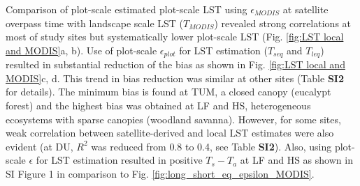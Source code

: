 \documentclass[fleqn,10pt]{wlscirep}
\begin{document}
Comparison of plot-scale estimated plot-scale LST using $\epsilon_{MODIS}$ at satellite overpass time with landscape scale LST ($T_{MODIS}$) revealed strong correlations at most of study sites but systematically lower plot-scale LST (Fig. \ref{fig:LST local and MODIS}a, b). Use  of plot-scale $\epsilon_{plot}$ for LST estimation ($T_{seq}$ and $T_{leq}$) resulted in substantial reduction of the bias as shown in Fig. \ref{fig:LST local and MODIS}c, d. This trend in bias reduction was similar at other sites (Table \textbf{SI2} for details). The  minimum bias is found  at TUM, a closed canopy (eucalypt forest) and the highest bias was obtained at LF and HS, heterogeneous ecosystems with sparse canopies (woodland savanna). However, for some sites, weak correlation between satellite-derived and local LST estimates were also evident (at DU, $R^2$ was reduced from 0.8 to 0.4, see Table \textbf{SI2}). Also, using plot-scale $\epsilon$ for LST estimation resulted in positive $T_{s} - T_{a}$ at LF and HS as shown in SI Figure 1 in comparison to Fig. \ref{fig:long_short_eq_epsilon_MODIS}.  
\end{document}

